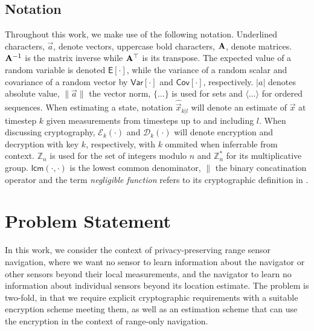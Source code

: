 \documentclass[10pt,letterpaper,oneside,twocolumn,journal]{IEEEtran}
\theoremstyle{definition}
\theoremstyle{definition}
\theoremstyle{remark}
\begin{document}
\subsection{Notation}
Throughout this work, we make use of the following notation. Underlined characters, $\vec{a}$, denote vectors, uppercase bold characters, ${{\mathbf{A}}}$, denote matrices. ${{\mathbf{A}}}^{-1}$ is the matrix inverse while ${{\mathbf{A}}}^\top$ is its transpose. The expected value of a random variable is denoted $\mathsf{E}[\cdot]$, while the variance of a random scalar and covariance of a random vector by $\mathsf{Var}[\cdot]$ and $\mathsf{Cov}[\cdot]$, respectively. $|a|$ denotes absolute value, $\lVert\vec{a}\rVert$ the vector norm, $\{\dots\}$ is used for sets and $\langle\dots\rangle$ for ordered sequences. When estimating a state, notation $\hat{\vec{x}}_{k|l}$ will denote an estimate of $\vec{x}$ at timestep $k$ given measurements from timesteps up to and including $l$. When discussing cryptography, $\mathcal{E}_{k}(\cdot)$ and $\mathcal{D}_{k}(\cdot)$ will denote encryption and decryption with key $k$, respectively, with $k$ ommited when inferrable from context. $\mathbb{Z}_n$ is used for the set of integers modulo $n$ and $\mathbb{Z}^*_n$ for its multiplicative group. $\mathsf{lcm}(\cdot,\cdot)$ is the lowest common denominator, $\|$ the binary concatination operator and the term \textit{negligible function} refers to its cryptographic definition in \cite{katzIntroductionModernCryptography2008}.

% 
%                                                                                
%                                                                                
%                                                                                
% 

\section{Problem Statement} \label{sec:problem_statement}
In this work, we consider the context of privacy-preserving range sensor navigation, where we want no sensor to learn information about the navigator or other sensors beyond their local measurements, and the navigator to learn no information about individual sensors beyond its location estimate. The problem is two-fold, in that we require explicit cryptographic requirements with a suitable encryption scheme meeting them, as well as an estimation scheme that can use the encryption in the context of range-only navigation.
\end{document}
